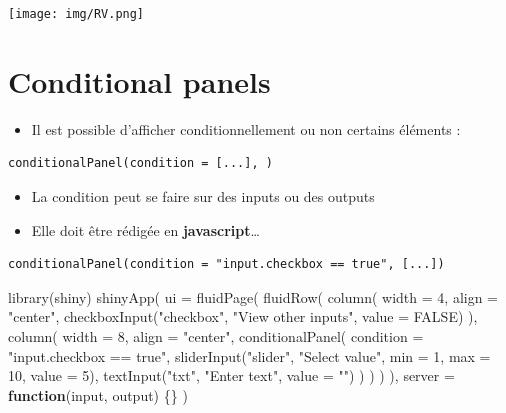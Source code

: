 \documentclass[
]{article}
\newenvironment{Shaded}{\begin{snugshade}}{\end{snugshade}}
\newcommand{\AttributeTok}[1]{\textcolor[rgb]{0.77,0.63,0.00}{#1}}
\newcommand{\ConstantTok}[1]{\textcolor[rgb]{0.00,0.00,0.00}{#1}}
\newcommand{\ControlFlowTok}[1]{\textcolor[rgb]{0.13,0.29,0.53}{\textbf{#1}}}
\newcommand{\DecValTok}[1]{\textcolor[rgb]{0.00,0.00,0.81}{#1}}
\newcommand{\FunctionTok}[1]{\textcolor[rgb]{0.00,0.00,0.00}{#1}}
\newcommand{\NormalTok}[1]{#1}
\newcommand{\StringTok}[1]{\textcolor[rgb]{0.31,0.60,0.02}{#1}}
\providecommand{\tightlist}{%
  \setlength{\itemsep}{0pt}\setlength{\parskip}{0pt}}
\begin{document}
\texttt{[image: img/RV.png]}

\hypertarget{conditional-panels}{%
\section{Conditional panels}\label{conditional-panels}}

\begin{itemize}
\tightlist
\item
  Il est possible d'afficher conditionnellement ou non certains éléments
  :
\end{itemize}

\begin{verbatim}
conditionalPanel(condition = [...], )
\end{verbatim}

\begin{itemize}
\tightlist
\item
  La condition peut se faire sur des inputs ou des outputs
\item
  Elle doit être rédigée en \textbf{javascript}\ldots{}
\end{itemize}

\begin{verbatim}
conditionalPanel(condition = "input.checkbox == true", [...])
\end{verbatim}

\begin{Shaded}
\begin{Highlighting}[]
\FunctionTok{library}\NormalTok{(shiny)}
\FunctionTok{shinyApp}\NormalTok{(}
  \AttributeTok{ui =} \FunctionTok{fluidPage}\NormalTok{(}
    \FunctionTok{fluidRow}\NormalTok{(}
      \FunctionTok{column}\NormalTok{(}
        \AttributeTok{width =} \DecValTok{4}\NormalTok{,}
        \AttributeTok{align =} \StringTok{"center"}\NormalTok{,}
        \FunctionTok{checkboxInput}\NormalTok{(}\StringTok{"checkbox"}\NormalTok{, }\StringTok{"View other inputs"}\NormalTok{, }\AttributeTok{value =} \ConstantTok{FALSE}\NormalTok{)}
\NormalTok{      ),}
      \FunctionTok{column}\NormalTok{(}
        \AttributeTok{width =} \DecValTok{8}\NormalTok{,}
        \AttributeTok{align =} \StringTok{"center"}\NormalTok{,}
        \FunctionTok{conditionalPanel}\NormalTok{(}
          \AttributeTok{condition =} \StringTok{"input.checkbox == true"}\NormalTok{, }
          \FunctionTok{sliderInput}\NormalTok{(}\StringTok{"slider"}\NormalTok{, }\StringTok{"Select value"}\NormalTok{, }\AttributeTok{min =} \DecValTok{1}\NormalTok{, }\AttributeTok{max =} \DecValTok{10}\NormalTok{, }\AttributeTok{value =} \DecValTok{5}\NormalTok{),}
          \FunctionTok{textInput}\NormalTok{(}\StringTok{"txt"}\NormalTok{, }\StringTok{"Enter text"}\NormalTok{, }\AttributeTok{value =} \StringTok{""}\NormalTok{)}
\NormalTok{        )}
\NormalTok{      )}
\NormalTok{    )}
\NormalTok{  ),}
  \AttributeTok{server =} \ControlFlowTok{function}\NormalTok{(input, output) \{\}}
\NormalTok{)}
\end{Highlighting}
\end{Shaded}
\end{document}
